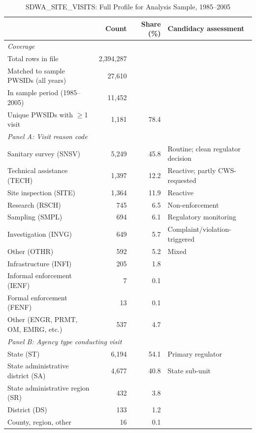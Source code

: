 
\begin{table}[h!]
\centering
\caption{SDWA\_SITE\_VISITS: Full Profile for Analysis Sample, 1985--2005}
\label{tab:profile_site_visits}
\small
\begin{tabular}{p{5.5cm}rrl}
\hline\hline
 & Count & Share (\%) & Candidacy assessment \\
\hline
\multicolumn{4}{l}{\textit{Coverage}} \\
Total rows in file & 2,394,287 & & \\
Matched to sample PWSIDs (all years) & 27,610 & & \\
In sample period (1985--2005) & 11,452 & & \\
Unique PWSIDs with $\geq$1 visit & 1,181 & 78.4 & \\[6pt]

\multicolumn{4}{l}{\textit{Panel A: Visit reason code}} \\
Sanitary survey (SNSV) & 5,249 & 45.8 & Routine; clean regulator decision \\
Technical assistance (TECH) & 1,397 & 12.2 & Reactive; partly CWS-requested \\
Site inspection (SITE) & 1,364 & 11.9 & Reactive \\
Research (RSCH) & 745 & 6.5 & Non-enforcement \\
Sampling (SMPL) & 694 & 6.1 & Regulatory monitoring \\
Investigation (INVG) & 649 & 5.7 & Complaint/violation-triggered \\
Other (OTHR) & 592 & 5.2 & Mixed \\
Infrastructure (INFI) & 205 & 1.8 & \\
Informal enforcement (IENF) & 7 & 0.1 & \\
Formal enforcement (FENF) & 13 & 0.1 & \\
Other (ENGR, PRMT, OM, EMRG, etc.) & 537 & 4.7 & \\[6pt]

\multicolumn{4}{l}{\textit{Panel B: Agency type conducting visit}} \\
State (ST) & 6,194 & 54.1 & Primary regulator \\
State administrative district (SA) & 4,677 & 40.8 & State sub-unit \\
State administrative region (SR) & 432 & 3.8 & \\
District (DS) & 133 & 1.2 & \\
County, region, other & 16 & 0.1 & \\[6pt]


\end{tabular}
\end{table}

